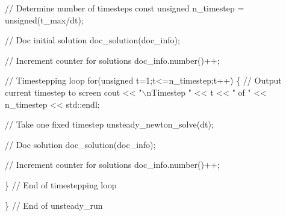 \begin{DoxyCodeInclude}
 \textcolor{comment}{// Determine number of timesteps}
 \textcolor{keyword}{const} \textcolor{keywordtype}{unsigned} n\_timestep = unsigned(t\_max/dt);

 \textcolor{comment}{// Doc initial solution}
 doc\_solution(doc\_info);

 \textcolor{comment}{// Increment counter for solutions}
 doc\_info.number()++;

 \textcolor{comment}{// Timestepping loop}
 \textcolor{keywordflow}{for}(\textcolor{keywordtype}{unsigned} t=1;t<=n\_timestep;t++)
  \{
   \textcolor{comment}{// Output current timestep to screen}
   cout << \textcolor{stringliteral}{"\(\backslash\)nTimestep "} << t << \textcolor{stringliteral}{" of "} << n\_timestep << std::endl;
   
   \textcolor{comment}{// Take one fixed timestep}
   unsteady\_newton\_solve(dt);

   \textcolor{comment}{// Doc solution}
   doc\_solution(doc\_info);

   \textcolor{comment}{// Increment counter for solutions }
   doc\_info.number()++;

  \} \textcolor{comment}{// End of timestepping loop}

\} \textcolor{comment}{// End of unsteady\_run}

\end{DoxyCodeInclude}




 

